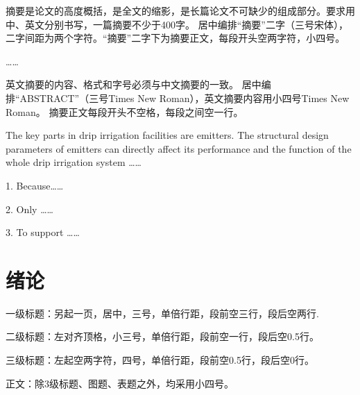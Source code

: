 \raggedbottom




\frontmatter

\begin{abstractcn} %

摘要是论文的高度概括，是全文的缩影，是长篇论文不可缺少的组成部分。要求用中、英文分别书写，一篇摘要不少于400字。
居中编排“摘要”二字（三号宋体），二字间距为两个字符。“摘要”二字下为摘要正文，每段开头空两字符，小四号。

……

\end{abstractcn}

\keywordscn{} %

\begin{abstracten} %

英文摘要的内容、格式和字号必须与中文摘要的一致。
居中编排“ABSTRACT”（三号Times New Roman），英文摘要内容用小四号Times New Roman。
摘要正文每段开头不空格，每段之间空一行。

The key parts in drip irrigation facilities are emitters. The structural design parameters of emitters can directly affect its performance and the function of the whole drip irrigation system ……

1. Because……

2. Only ……

3. To support ……

\end{abstracten}

\keywordsen{} %

\tableofcontents %

\mainmatter

\section{绪论}

一级标题：另起一页，居中，三号，单倍行距，段前空三行，段后空两行. 

二级标题：左对齐顶格，小三号，单倍行距，段前空一行，段后空0.5行。

三级标题：左起空两字符，四号，单倍行距，段前空0.5行，段后空0行。

正文：除3级标题、图题、表题之外，均采用小四号。

